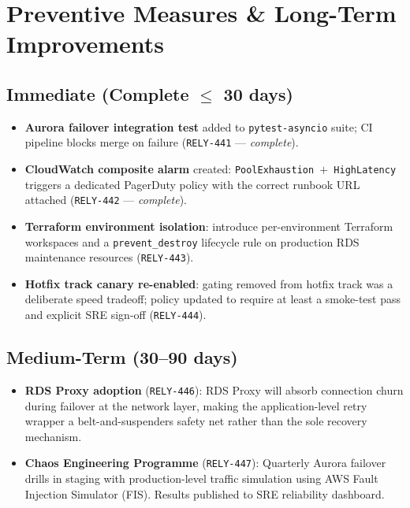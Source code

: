 \documentclass[11pt,a4paper]{article}
\begin{document}
\section{Preventive Measures \& Long-Term Improvements}

\subsection{Immediate (Complete $\leq$ 30 days)}

\begin{itemize}[leftmargin=*, itemsep=3pt]
  \item[\textcolor{accent}{\faIcon{check-square}}]
    \textbf{Aurora failover integration test} added to \texttt{pytest-asyncio} suite;
    CI pipeline blocks merge on failure (\texttt{RELY-441} --- \textit{complete}).

  \item[\textcolor{accent}{\faIcon{check-square}}]
    \textbf{CloudWatch composite alarm} created: \texttt{PoolExhaustion $+$ HighLatency}
    triggers a dedicated PagerDuty policy with the correct runbook URL attached
    (\texttt{RELY-442} --- \textit{complete}).

  \item[\textcolor{sev2}{\faIcon{hourglass-half}}]
    \textbf{Terraform environment isolation}: introduce per-environment Terraform
    workspaces and a \texttt{prevent\_destroy} lifecycle rule on production RDS
    maintenance resources (\texttt{RELY-443}).

  \item[\textcolor{sev2}{\faIcon{hourglass-half}}]
    \textbf{Hotfix track canary re-enabled}: gating removed from hotfix track was a
    deliberate speed tradeoff; policy updated to require at least a smoke-test pass
    and explicit SRE sign-off (\texttt{RELY-444}).
\end{itemize}

\subsection{Medium-Term (30--90 days)}

\begin{itemize}[leftmargin=*, itemsep=3pt]
  \item[\textcolor{statusopen}{\faIcon{circle}}]
    \textbf{RDS Proxy adoption} (\texttt{RELY-446}): RDS Proxy will absorb connection
    churn during failover at the network layer, making the application-level retry
    wrapper a belt-and-suspenders safety net rather than the sole recovery mechanism.

  \item[\textcolor{statusopen}{\faIcon{circle}}]
    \textbf{Chaos Engineering Programme} (\texttt{RELY-447}): Quarterly Aurora
    failover drills in staging with production-level traffic simulation using AWS
    Fault Injection Simulator (FIS). Results published to SRE reliability dashboard.
\end{itemize}
\end{document}
